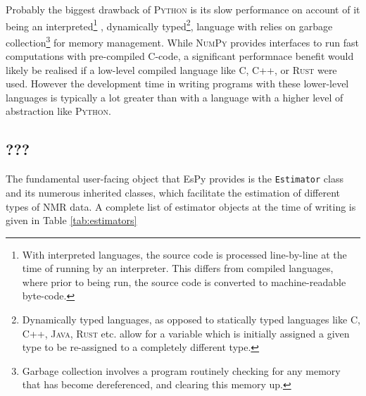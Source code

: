 Probably the biggest drawback of \textsc{Python} is its slow performance on
account of it being an interpreted\footnote{
    With interpreted languages, the source code is processed line-by-line at
    the time of running by an interpreter. This differs from compiled
    languages, where prior to being run, the source code is converted to
    machine-readable byte-code.
}
, dynamically typed\footnote{
    Dynamically typed languages, as opposed to statically typed languages like
    \textsc{C}, \textsc{C++}, \textsc{Java}, \textsc{Rust} etc. allow for a
    variable which is initially assigned a given type to be re-assigned to a
    completely different type.
}, language with relies on garbage collection\footnote{
    Garbage collection involves a program routinely checking for any memory
    that has become dereferenced, and clearing this memory up.
}
for memory management. While \textsc{NumPy} provides interfaces to run fast
computations with pre-compiled C-code, a significant performnace benefit would
likely be realised if a low-level compiled language like C, C++, or
\textsc{Rust} were used. However the development time in writing programs with
these lower-level languages is typically a lot greater than with a language
with a higher level of abstraction like \textsc{Python}.

\subsection{???}
The fundamental user-facing object that \ac{EsPy} provides is the
\texttt{Estimator} class and its numerous inherited classes, which facilitate
the estimation of different types of \ac{NMR} data. A
complete list of estimator objects at the time of writing is given in Table
\ref{tab:estimators}

